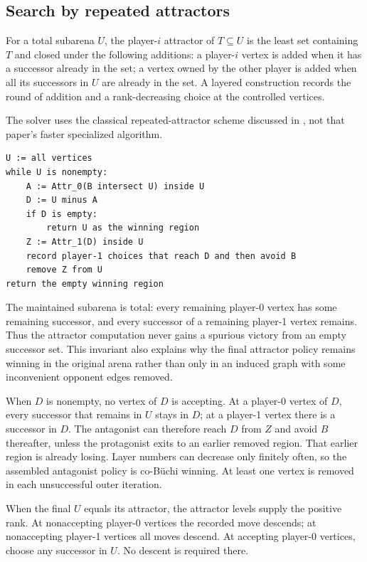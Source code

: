 \subsection{Search by repeated attractors}
For a total subarena $U$, the player-$i$ attractor of $T\subseteq U$ is the
least set containing $T$ and closed under the following additions: a
player-$i$ vertex is added when it has a successor already in the set; a vertex
owned by the other player is added when all its successors in $U$ are already
in the set. A layered construction records the round of addition and a
rank-decreasing choice at the controlled vertices.

The solver uses the classical repeated-attractor scheme discussed in
\cite{chatterjee-henzinger}, not that paper's faster specialized algorithm.
\begin{lstlisting}[caption={The implemented Buechi search, in semantic pseudocode.}]
U := all vertices
while U is nonempty:
    A := Attr_0(B intersect U) inside U
    D := U minus A
    if D is empty:
        return U as the winning region
    Z := Attr_1(D) inside U
    record player-1 choices that reach D and then avoid B
    remove Z from U
return the empty winning region
\end{lstlisting}

The maintained subarena is total: every remaining player-0 vertex has some
remaining successor, and every successor of a remaining player-1 vertex
remains. Thus the attractor computation never gains a spurious victory from an
empty successor set. This invariant also explains why the final attractor
policy remains winning in the original arena rather than only in an induced
graph with some inconvenient opponent edges removed.

When $D$ is nonempty, no vertex of $D$ is accepting. At a player-0 vertex of
$D$, every successor that remains in $U$ stays in $D$; at a player-1 vertex
there is a successor in $D$. The antagonist can therefore reach $D$ from $Z$
and avoid $B$ thereafter, unless the protagonist exits to an earlier removed
region. That earlier region is already losing. Layer numbers can decrease only
finitely often, so the assembled antagonist policy is co-B\"uchi winning.
At least one vertex is removed in each unsuccessful outer iteration.

When the final $U$ equals its attractor, the attractor levels supply the
positive rank. At nonaccepting player-0 vertices the recorded move descends; at
nonaccepting player-1 vertices all moves descend. At accepting player-0
vertices, choose any successor in $U$. No descent is required there.

